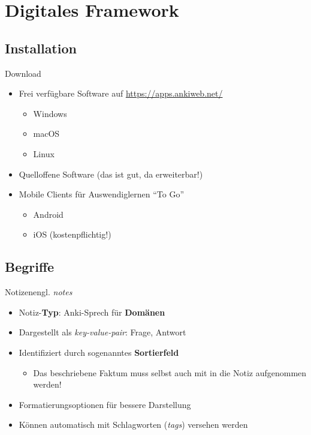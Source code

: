 \documentclass[aspectratio=169,compress]{beamer}
\begin{document}
\section{Digitales Framework}
\subsection{Installation}

\begin{frame}{Download}
	\begin{itemize}
	\item Frei verfügbare Software auf \url{https://apps.ankiweb.net/}
		\begin{itemize}
			\item Windows
			\item macOS
			\item Linux
		\end{itemize}
	\item Quelloffene Software (das ist gut, da erweiterbar!)
	\item Mobile Clients für Auswendiglernen \enquote{To Go}
		\begin{itemize}
			\item Android
			\item iOS (kostenpflichtig!)
		\end{itemize}
	\end{itemize}
\end{frame}

\subsection{Begriffe}

\begin{frame}{Notizen}{engl. \textit{notes}}
	\begin{itemize}
		\item Notiz-\textbf{Typ}: Anki-Sprech für \textbf{Domänen}
		\item Dargestellt als \textit{key-value-pair}: Frage, Antwort
		\item Identifiziert durch sogenanntes \textbf{Sortierfeld}
		\begin{itemize}
			\item Das beschriebene Faktum muss selbst auch mit in die Notiz aufgenommen werden!
		\end{itemize}
		\item Formatierungsoptionen für bessere Darstellung
		\item Können automatisch mit Schlagworten (\textit{tags}) versehen werden
	\end{itemize}
\end{frame}
\end{document}
